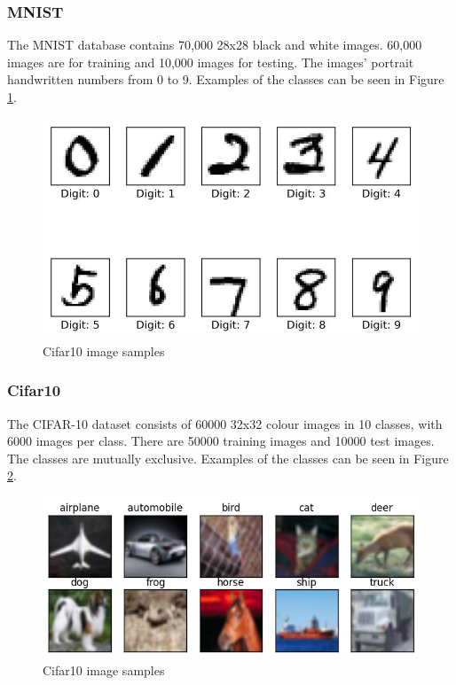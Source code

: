 \documentclass[conference]{IEEEtran}
\begin{document}
\subsubsection{MNIST}
The MNIST database contains 70,000 28x28 black and white images. 60,000 images are for training and 10,000 images for testing. The images' portrait handwritten numbers from 0 to 9. \cite{yann_lecun_mnist_nodate} Examples of the classes can be seen in Figure \ref{fig:x MNIST image samples}.
\begin{figure}[!htbp]
    \centering
    \includegraphics[scale=0.35]{img/mnist_sample.jpeg}
    \caption{Cifar10 image samples \cite{noauthor_convolutional_nodate}}
    \label{fig:x MNIST image samples}
\end{figure}
\subsubsection{Cifar10}
The CIFAR-10 dataset consists of 60000 32x32 colour images in 10 classes, with 6000 images per class. There are 50000 training images and 10000 test images. The classes are mutually exclusive.\cite{noauthor_cifar-10_nodate} Examples of the classes can be seen in Figure \ref{fig:x Cifar10 image samples}.
\begin{figure}[!htbp]
    \centering
    \includegraphics[scale=0.45]{img/cifar_10_sample.png}
    \caption{Cifar10 image samples \cite{noauthor_fig_nodate}}
    \label{fig:x Cifar10 image samples}
\end{figure}
\end{document}

